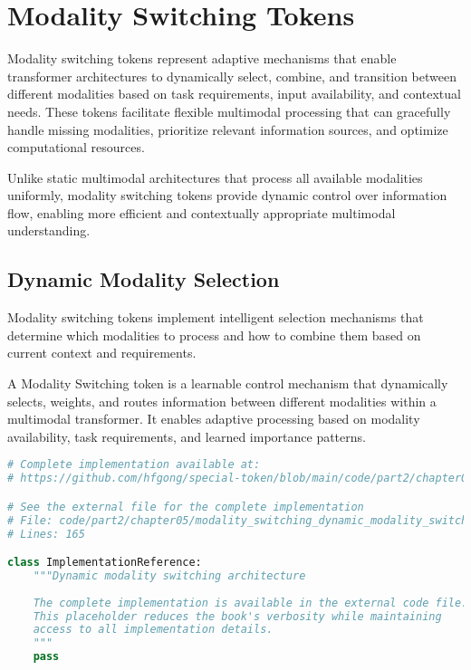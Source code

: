 
\section{Modality Switching Tokens}

Modality switching tokens represent adaptive mechanisms that enable transformer architectures to dynamically select, combine, and transition between different modalities based on task requirements, input availability, and contextual needs. These tokens facilitate flexible multimodal processing that can gracefully handle missing modalities, prioritize relevant information sources, and optimize computational resources.

Unlike static multimodal architectures that process all available modalities uniformly, modality switching tokens provide dynamic control over information flow, enabling more efficient and contextually appropriate multimodal understanding.

\subsection{Dynamic Modality Selection}

Modality switching tokens implement intelligent selection mechanisms that determine which modalities to process and how to combine them based on current context and requirements.

\begin{definition}
A Modality Switching token is a learnable control mechanism that dynamically selects, weights, and routes information between different modalities within a multimodal transformer. It enables adaptive processing based on modality availability, task requirements, and learned importance patterns.
\end{definition}

\begin{lstlisting}[language=Python, caption={Dynamic modality switching architecture}]
# Complete implementation available at:
# https://github.com/hfgong/special-token/blob/main/code/part2/chapter05/modality_switching_dynamic_modality_switching_arc.py

# See the external file for the complete implementation
# File: code/part2/chapter05/modality_switching_dynamic_modality_switching_arc.py
# Lines: 165

class ImplementationReference:
    """Dynamic modality switching architecture
    
    The complete implementation is available in the external code file.
    This placeholder reduces the book's verbosity while maintaining
    access to all implementation details.
    """
    pass
\end{lstlisting}

